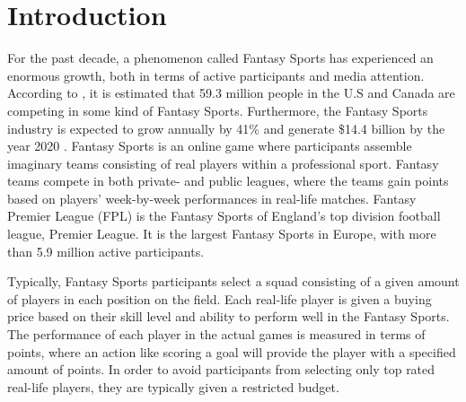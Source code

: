 
\pagestyle{fancy}
\fancyhf{}
\renewcommand{\chaptermark}[1]{\markboth{\chaptername\ \thechapter.\ #1}{}}
\renewcommand{\sectionmark}[1]{\markright{\thesection\ #1}}
\renewcommand{\headrulewidth}{0.1ex}
\renewcommand{\footrulewidth}{0.1ex}
\fancyfoot[LE,RO]{\thepage}
\fancyhead[LE]{\leftmark}
\fancyhead[RO]{\rightmark}
\fancypagestyle{plain}{\fancyhf{}\fancyfoot[LE,RO]{\thepage}\renewcommand{\headrulewidth}{0ex}}

\setcounter{page}{1}

\chapter{Introduction}\label{introduction}


For the past decade, a phenomenon called Fantasy Sports has experienced an enormous growth, both in terms of active participants and media attention. According to \cite{fantasysports_users}, it is estimated that 59.3 million people in the U.S and Canada are competing in some kind of Fantasy Sports. Furthermore, the Fantasy Sports industry is expected to grow annually by 41\% and generate \$14.4 billion by the year 2020 \citep{forbes}. Fantasy Sports is an online game where participants assemble imaginary teams consisting of real players within a professional sport. Fantasy teams compete in both private- and public leagues, where the teams gain points  based on players' week-by-week performances in real-life matches. Fantasy Premier League (FPL) is the Fantasy Sports of England's top division football league, Premier League. It is the largest Fantasy Sports in Europe, with more than 5.9 million active participants. 

\newpar


Typically, Fantasy Sports participants select a squad consisting of a given amount of players in each position on the field. Each real-life player is given a buying price based on their skill level and ability to perform well in the Fantasy Sports. The performance of each player in the actual games is measured in terms of points, where an action like scoring a goal will provide the player with a specified amount of points. In order to avoid participants from selecting only top rated real-life players, they are typically given a restricted budget.

